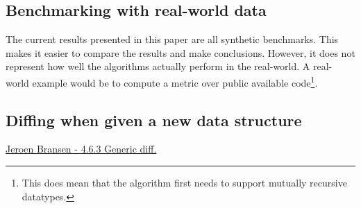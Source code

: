 \subsection{Benchmarking with real-world data}
The current results presented in this paper are all synthetic benchmarks. This makes it easier to compare the results and make conclusions. However, it does not represent how well the algorithms actually perform in the real-world. A real-world example would be to compute a metric over public available code\footnote{This does mean that the algorithm first needs to support mutually recursive datatypes.}.

\subsection{Diffing when given a new data structure}
\href{http://jeroen.bransen.nl/phdthesis.pdf}{Jeroen Bransen - 4.6.3 Generic diff.}
